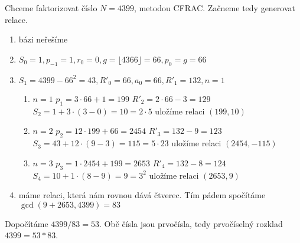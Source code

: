 \documentclass[12pt, a4paper]{article}
\begin{document}
Chceme faktorizovat číslo $N=4399$, metodou CFRAC. Začneme tedy generovat relace.
\begin{enumerate}
\item bázi neřešíme
\item $S_0 = 1, p_{-1}=1, r_0 = 0, g = \lfloor 4366 \rfloor = 66, p_0 = g = 66$
\item $S_1 = 4399 - 66^2 = 43, R'_0 = 66, a_0 = 66, R'_1 = 132, n=1$
\begin{enumerate}
\item $n = 1$
\subitem $p_1 = 3 \cdot 66 + 1 = 199$
\subitem $R'_2 = 2\cdot 66 - 3 = 129$
\subitem $S_2 = 1 + 3\cdot(3-0) = 10 = 2 \cdot 5$
\subitem uložíme relaci $(199, 10)$
\item $n = 2$
\subitem $p_2 = 12 \cdot 199 + 66 = 2454$
\subitem $R'_3 = 132 - 9 = 123$
\subitem $S_3 = 43 + 12\cdot(9-3) = 115 = 5 \cdot 23$
\subitem uložíme relaci $(2454, -115)$
\item $n = 3$
\subitem $p_3 = 1 \cdot 2454 + 199 = 2653$
\subitem $R'_4 = 132 - 8 = 124$
\subitem $S_4 = 10 + 1\cdot(8-9) = 9 = 3^2$
\subitem uložíme relaci $(2653, 9)$
\end{enumerate}
\item máme relaci, která nám rovnou dává čtverec. Tím pádem spočítáme $\gcd(9+2653,4399)=83$
\end{enumerate}
Dopočítáme $4399/83 = 53$. Obě čísla jsou prvočísla, tedy prvočíselný rozklad $4399 = 53 * 83$.
\end{document}
